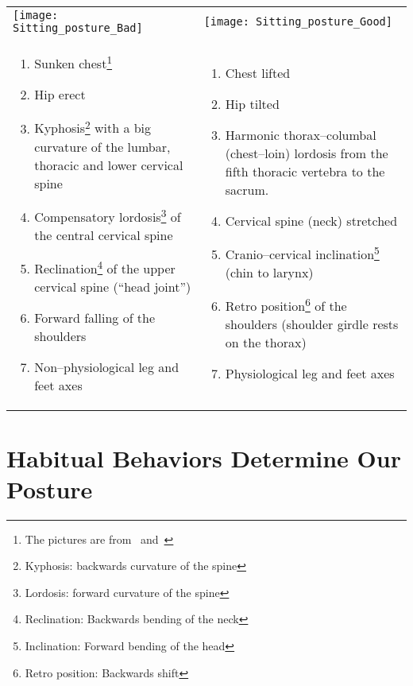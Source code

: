 \documentclass[../main.tex]{subfiles}
\begin{document}
\begin{minipage}{\textwidth}
\begin{tabular}{p{6.3cm}p{6.3cm}}
  \texttt{[image: Sitting\_posture\_Bad]} &

\texttt{[image: Sitting\_posture\_Good]} \\

  \begin{enumerate}
\item {Sunken chest}\footnote{The pictures are from~\cite{Haltung} and~\cite{Darmreinig}}
\item Hip erect
\item Kyphosis\footnote{Kyphosis: backwards curvature of the spine} with a big {curvature} of the lumbar, thoracic and lower cervical {spine}
\item Compensatory lordosis\footnote{Lordosis: forward curvature of the spine}
  of the central cervical spine
\item Reclination\footnote{Reclination: Backwards bending of the neck}
  of the upper cervical spine (``head joint'')
\item {Forward falling of the shoulders}
\item Non--physiological leg and feet axes
    \end{enumerate} &

  \begin{enumerate}
\item {Chest lifted}
\item Hip tilted
\item Harmonic thorax--columbal (chest--loin) {lordosis} from the fifth thoracic vertebra to the sacrum.
\item Cervical spine (neck) stretched
\item Cranio--cervical inclination\footnote{Inclination: Forward bending of the head} ({chin to larynx})
\item Retro position\footnote{Retro position: Backwards shift} of the shoulders ({shoulder girdle rests on the thorax})
\item Physiological leg and feet axes

    \end{enumerate}
\\
  
  \end{tabular}
\end{minipage}

\newpage
\section{Habitual Behaviors Determine Our Posture}
\end{document}
